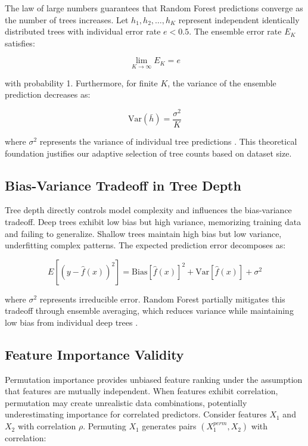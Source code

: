 \documentclass[conference]{IEEEtran}
\begin{document}
The law of large numbers guarantees that Random Forest predictions converge as the number of trees increases. Let $h_1, h_2, \ldots, h_K$ represent independent identically distributed trees with individual error rate $e < 0.5$. The ensemble error rate $E_K$ satisfies:

\begin{equation}
\lim_{K \to \infty} E_K = e
\end{equation}

with probability 1. Furthermore, for finite $K$, the variance of the ensemble prediction decreases as:

\begin{equation}
\text{Var}(\bar{h}) = \frac{\sigma^2}{K}
\end{equation}

where $\sigma^2$ represents the variance of individual tree predictions \cite{breiman2001random}. This theoretical foundation justifies our adaptive selection of tree counts based on dataset size.

\subsection{Bias-Variance Tradeoff in Tree Depth}

Tree depth directly controls model complexity and influences the bias-variance tradeoff. Deep trees exhibit low bias but high variance, memorizing training data and failing to generalize. Shallow trees maintain high bias but low variance, underfitting complex patterns. The expected prediction error decomposes as:

\begin{equation}
E[(y - \hat{f}(x))^2] = \text{Bias}[\hat{f}(x)]^2 + \text{Var}[\hat{f}(x)] + \sigma^2
\end{equation}

where $\sigma^2$ represents irreducible error. Random Forest partially mitigates this tradeoff through ensemble averaging, which reduces variance while maintaining low bias from individual deep trees \cite{hastie2009elements}.

\subsection{Feature Importance Validity}

Permutation importance provides unbiased feature ranking under the assumption that features are mutually independent. When features exhibit correlation, permutation may create unrealistic data combinations, potentially underestimating importance for correlated predictors. Consider features $X_1$ and $X_2$ with correlation $\rho$. Permuting $X_1$ generates pairs $(X_1^{perm}, X_2)$ with correlation:
\end{document}
